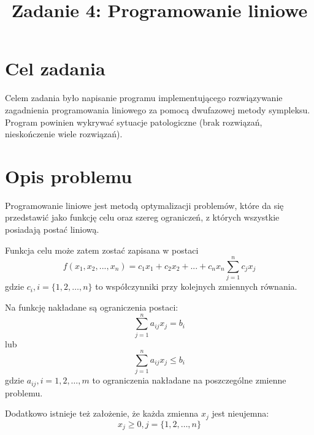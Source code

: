 \documentclass{classrep}
\author{%
  \studentinfo{Michał Janiszewski}{169485} \and
  \studentinfo{Leszek Wach}{}
}
\title{Zadanie 4: Programowanie liniowe}
\begin{document}
\maketitle

\section{Cel zadania}
Celem zadania było napisanie programu implementującego rozwiązywanie zagadnienia programowania liniowego za pomocą dwufazowej metody sympleksu. Program powinien wykrywać sytuacje patologiczne (brak rozwiązań, nieskończenie wiele rozwiązań).

\section{Opis problemu}
Programowanie liniowe jest metodą optymalizacji problemów, które da się przedstawić jako funkcję celu oraz szereg ograniczeń, z których wszystkie posiadają postać liniową.

Funkcja celu może zatem zostać zapisana w postaci
\begin{equation}
  f(x_1, x_2, ..., x_n) = c_1 x_1 + c_2 x_2 + ... + c_n x_n \displaystyle\sum_{j=1}^n c_j x_j
\end{equation}
gdzie $c_i, i = \{1, 2, \ldots, n\}$ to współczynniki przy kolejnych zmiennych równania.

Na funkcję nakładane są ograniczenia postaci:
\begin{equation}
  \displaystyle\sum_{j=1}^n a_{ij} x_j = b_i
  \label{eq.restraint_equal}
\end{equation}
lub
\begin{equation}
  \displaystyle\sum_{j=1}^n a_{ij} x_j \leq b_i
  \label{eq.restraint_inequal}
\end{equation}
gdzie $a_{ij}, i = {1, 2, \ldots, m}$ to ograniczenia nakładane na poszczególne zmienne problemu.

Dodatkowo istnieje też założenie, że każda zmienna $x_j$ jest nieujemna:
\begin{equation}
  x_j \geq 0, j = \{1, 2, \ldots, n\}
\end{equation}
\end{document}

